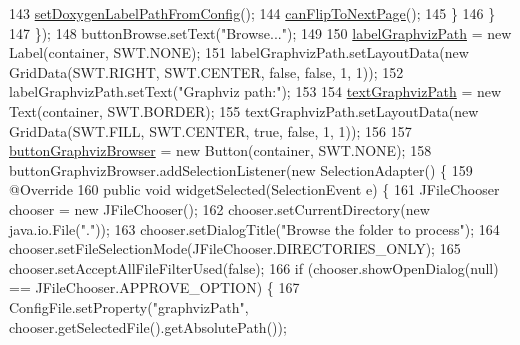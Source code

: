 \begin{DoxyCode}
143                     \hyperlink{classit_1_1isislab_1_1masonhelperdocumentation_1_1mason_1_1wizards_1_1_b___project_information_page_a787830581d3746b970cde68fec9d59b3}{setDoxygenLabelPathFromConfig}();
144                     \hyperlink{classit_1_1isislab_1_1masonhelperdocumentation_1_1mason_1_1wizards_1_1_b___project_information_page_af534554cbdceb3c61b1f48b5df4e290c}{canFlipToNextPage}();
145                 \}
146             \}
147         \});
148         buttonBrowse.setText(\textcolor{stringliteral}{"Browse..."});
149         
150         \hyperlink{classit_1_1isislab_1_1masonhelperdocumentation_1_1mason_1_1wizards_1_1_b___project_information_page_a57169e3a422df52ec0ade1e68cab1e02}{labelGraphvizPath} = \textcolor{keyword}{new} Label(container, SWT.NONE);
151         labelGraphvizPath.setLayoutData(\textcolor{keyword}{new} GridData(SWT.RIGHT, SWT.CENTER, \textcolor{keyword}{false}, \textcolor{keyword}{false}, 1, 1));
152         labelGraphvizPath.setText(\textcolor{stringliteral}{"Graphviz path:"});
153         
154         \hyperlink{classit_1_1isislab_1_1masonhelperdocumentation_1_1mason_1_1wizards_1_1_b___project_information_page_a7aefdf9fbb7f43f9b7d2a8175e7128e7}{textGraphvizPath} = \textcolor{keyword}{new} Text(container, SWT.BORDER);
155         textGraphvizPath.setLayoutData(\textcolor{keyword}{new} GridData(SWT.FILL, SWT.CENTER, \textcolor{keyword}{true}, \textcolor{keyword}{false}, 1, 1));
156         
157         \hyperlink{classit_1_1isislab_1_1masonhelperdocumentation_1_1mason_1_1wizards_1_1_b___project_information_page_ac42d6f27c381517f450b92aff3407d3b}{buttonGraphvizBrowser} = \textcolor{keyword}{new} Button(container, SWT.NONE);
158         buttonGraphvizBrowser.addSelectionListener(\textcolor{keyword}{new} SelectionAdapter() \{
159             @Override
160             \textcolor{keyword}{public} \textcolor{keywordtype}{void} widgetSelected(SelectionEvent e) \{
161                 JFileChooser chooser = \textcolor{keyword}{new} JFileChooser();
162                 chooser.setCurrentDirectory(\textcolor{keyword}{new} java.io.File(\textcolor{stringliteral}{"."}));
163                 chooser.setDialogTitle(\textcolor{stringliteral}{"Browse the folder to process"});
164                 chooser.setFileSelectionMode(JFileChooser.DIRECTORIES\_ONLY);
165                 chooser.setAcceptAllFileFilterUsed(\textcolor{keyword}{false});
166                 \textcolor{keywordflow}{if} (chooser.showOpenDialog(null) == JFileChooser.APPROVE\_OPTION) \{                  
167                     ConfigFile.setProperty(\textcolor{stringliteral}{"graphvizPath"}, chooser.getSelectedFile().getAbsolutePath());

\end{DoxyCode}
